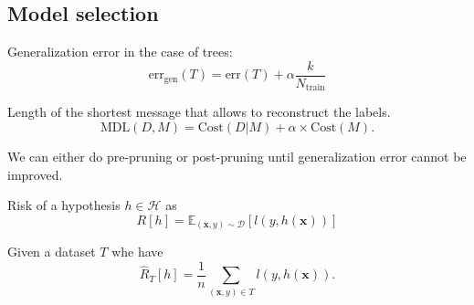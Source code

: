 \documentclass[a4paper,9pt]{extarticle}
\begin{document}
\begin{multicols*}{2}
\section{Model selection}
Generalization error in the case of trees:
\begin{equation*}
	\mathrm{err}_{\text{gen}}(T)=\mathrm{err}(T)+\alpha\frac{k}{N_{\text{train}}}
\end{equation*}
\begin{riquadro}
	Length of the shortest message that allows to reconstruct the labels.
	\begin{equation*}
		\mathrm{MDL}(D,M)=\text{Cost}(D|M)+\alpha\times\text{Cost}(M).
	\end{equation*}
\end{riquadro}
We can either do pre-pruning or post-pruning until generalization error cannot be improved.
\begin{riquadro}
	Risk of a hypothesis $h\in\mathcal{H}$ as
	\begin{equation*}
		R[h]=\mathbb{E}_{(\bm{x},y)\sim\mathcal{D}}\left[l(y,h(\bm{x}))\right]
	\end{equation*}
\end{riquadro}
\begin{riquadro}
	Given a dataset $T$ whe have
	\begin{equation*}
		\hat{R}_{T}[h]=\frac{1}{n}\sum_{(\bm{x},y)\in T}l(y,h(\bm{x})).
	\end{equation*}
\end{riquadro}

\end{multicols*}
\end{document}
